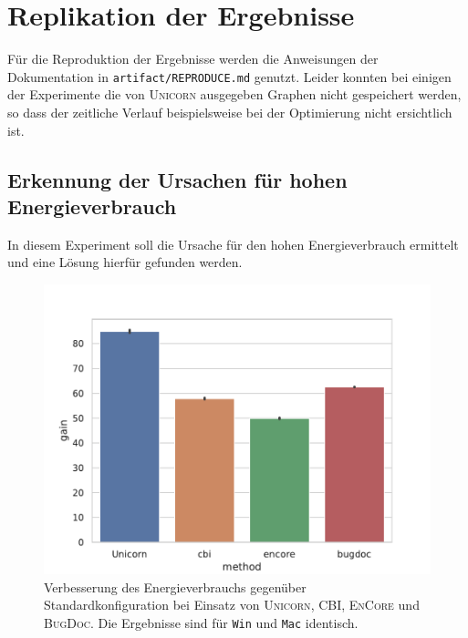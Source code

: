 \documentclass[11pt]{article}
\begin{document}
\section{Replikation der Ergebnisse}

Für die Reproduktion der Ergebnisse werden die Anweisungen der Dokumentation in \texttt{artifact/REPRODUCE.md} genutzt. Leider konnten bei einigen der Experimente die von \textsc{Unicorn} ausgegeben Graphen nicht gespeichert werden, so dass der zeitliche Verlauf beispielsweise bei der Optimierung nicht ersichtlich ist.

\subsection{Erkennung der Ursachen für hohen Energieverbrauch}\label{sec:1}

In diesem Experiment soll die Ursache für den hohen Energieverbrauch ermittelt und eine Lösung hierfür gefunden werden.

\begin{figure}[tp!]
  \centering
  \includegraphics[width=\linewidth]{./img/win_debug_gain.pdf}
  \caption{Verbesserung des Energieverbrauchs gegenüber Standardkonfiguration bei Einsatz von \textsc{Unicorn}, CBI, \textsc{EnCore} und \textsc{BugDoc}. Die Ergebnisse sind für \texttt{Win} und \texttt{Mac} identisch.}

  \label{fig:1}
\end{figure}
\end{document}
